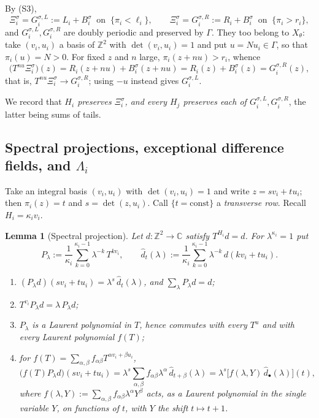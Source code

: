 \documentclass[11pt,reqno]{amsart}
\theoremstyle{plain}
\newtheorem{lem}[thm]{Lemma}
\theoremstyle{definition}
\theoremstyle{remark}
\theoremstyle{plain}
\theoremstyle{remark}
\theoremstyle{definition}
\numberwithin{equation}{section}
\newcommand{\Z}{\mathbb{Z}}
\newcommand{\C}{\mathbb{C}}
\begin{document}
By \textup{(S3)},
\[\Xi_i^\sigma=G_i^{\sigma,L}:=L_i+B_i^\sigma\ \text{ on }\ \{\pi_i<\ell_i\},
  \qquad
  \Xi_i^\sigma=G_i^{\sigma,R}:=R_i+B_i^\sigma\ \text{ on }\ \{\pi_i>r_i\},\]
and $G_i^{\sigma,L},G_i^{\sigma,R}$ are doubly periodic and preserved by
$\Gamma$.  They too belong to $X_\theta$: take $(v_i,u_i)$ a basis of $\Z^2$
with $\det(v_i,u_i)=1$ and put $u=Nu_i\in\Gamma$, so that $\pi_i(u)=N>0$.  For
fixed $z$ and $n$ large, $\pi_i(z+nu)>r_i$, whence
\[\bigl(T^{nu}\Xi_i^\sigma\bigr)(z)=R_i(z+nu)+B_i^\sigma(z+nu)
  =R_i(z)+B_i^\sigma(z)=G_i^{\sigma,R}(z),\]
that is, $T^{nu}\Xi_i^\sigma\to G_i^{\sigma,R}$; using $-u$ instead gives
$G_i^{\sigma,L}$.

We record that \emph{$H_i$ preserves $\Xi_i^\sigma$, and every $H_j$ preserves
each of $G_i^{\sigma,L},G_i^{\sigma,R}$}, the latter being sums of tails.

\subsection{Spectral projections, exceptional difference fields, and
\texorpdfstring{$\Lambda_i$}{Lambda\_i}}\label{ssec:spectra}

Take an integral basis $(v_i,u_i)$ with $\det(v_i,u_i)=1$ and write
$z=sv_i+tu_i$; then $\pi_i(z)=t$ and $s=\det(z,u_i)$.  Call
$\{t=\text{const}\}$ a \emph{transverse row}.  Recall $H_i=\kappa_iv_i$.

\begin{lem}[Spectral projection]\label{lem:spectral}
Let $d\colon\Z^2\to\C$ satisfy $T^{H_i}d=d$.  For $\lambda^{\kappa_i}=1$ put
\[P_\lambda:=\frac1{\kappa_i}\sum_{k=0}^{\kappa_i-1}\lambda^{-k}\,T^{kv_i},
  \qquad
  \widehat d_t(\lambda):=\frac1{\kappa_i}\sum_{k=0}^{\kappa_i-1}\lambda^{-k}\,
  d(kv_i+tu_i).\]
\begin{enumerate}
\item $(P_\lambda d)(sv_i+tu_i)=\lambda^s\,\widehat d_t(\lambda)$, and
      $\sum_{\lambda}P_\lambda d=d$;
\item $T^{v_i}P_\lambda d=\lambda\,P_\lambda d$;
\item $P_\lambda$ is a Laurent polynomial in $T$, hence commutes with every
      $T^u$ and with every Laurent polynomial $f(T)$;
\item for $f(T)=\sum_{\alpha,\beta}f_{\alpha\beta}T^{\alpha v_i+\beta u_i}$,
\[\bigl(f(T)P_\lambda d\bigr)(sv_i+tu_i)
  =\lambda^{s}\sum_{\alpha,\beta}f_{\alpha\beta}\lambda^{\alpha}\,
    \widehat d_{t+\beta}(\lambda)
  =\lambda^s\bigl[f(\lambda,Y)\,\widehat d_{\bullet}(\lambda)\bigr](t),\]
      where $f(\lambda,Y):=\sum_{\alpha,\beta}f_{\alpha\beta}\lambda^\alpha
      Y^\beta$ acts, as a Laurent polynomial in the single variable $Y$, on
      functions of $t$, with $Y$ the shift $t\mapsto t+1$.
\end{enumerate}
\end{lem}
\end{document}
